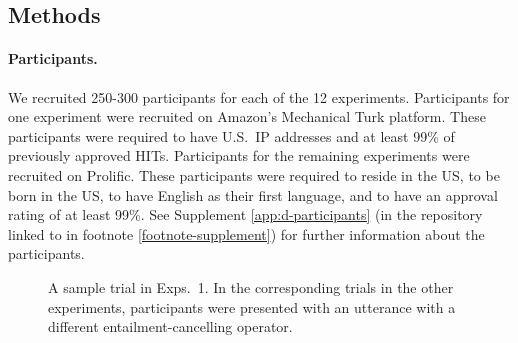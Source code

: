 \documentclass[a4paper,12pt,twoside]{article}
\begin{document}


	\subsection{Methods}

        \paragraph{Participants.}
			We recruited 250-300 participants for each of the 12 experiments. Participants for one experiment were recruited on Amazon's Mechanical Turk platform. These participants were required to have U.S.\ IP addresses and at least 99\% of previously approved HITs. Participants for the remaining experiments were recruited on Prolific. These participants were required to reside in the US, to be born in the US, to have English as their first language, and to have an approval rating of at least 99\%. See Supplement \ref{app:d-participants} (in the repository linked to in footnote \ref{footnote-supplement}) for further information about the participants. 
			

            \begin{figure}[h!]
				\centering
				\caption{A sample trial in Exps.~1. In the corresponding trials in the other experiments, participants were presented with an utterance with a different entailment-cancelling operator.}
				\label{fig:trial}
			\end{figure}
   
\end{document}
